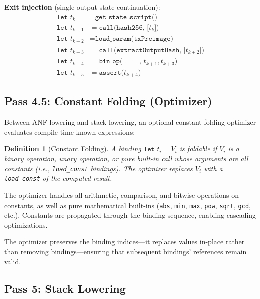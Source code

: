\documentclass[11pt,a4paper]{article}
\newtheorem{definition}[theorem]{Definition}
\begin{document}
\textbf{Exit injection} (single-output state continuation):
\begin{align*}
  \texttt{let } t_k &= \texttt{get\_state\_script()} \\
  \texttt{let } t_{k+1} &= \texttt{call(hash256, [}t_k\texttt{])} \\
  \texttt{let } t_{k+2} &= \texttt{load\_param(txPreimage)} \\
  \texttt{let } t_{k+3} &= \texttt{call(extractOutputHash, [}t_{k+2}\texttt{])} \\
  \texttt{let } t_{k+4} &= \texttt{bin\_op(===, }t_{k+1}, t_{k+3}\texttt{)}  \\
  \texttt{let } t_{k+5} &= \texttt{assert(}t_{k+4}\texttt{)}
\end{align*}

\subsection{Pass 4.5: Constant Folding (Optimizer)}
\label{sec:pass-optimize}

Between ANF lowering and stack lowering, an optional constant folding
optimizer evaluates compile-time-known expressions:

\begin{definition}[Constant Folding]
A binding $\texttt{let } t_i = V_i$ is \emph{foldable} if $V_i$ is a
binary operation, unary operation, or pure built-in call whose arguments
are all constants (i.e., \texttt{load\_const} bindings). The optimizer
replaces $V_i$ with a \texttt{load\_const} of the computed result.
\end{definition}

The optimizer handles all arithmetic, comparison, and bitwise operations on
constants, as well as pure mathematical built-ins (\texttt{abs}, \texttt{min},
\texttt{max}, \texttt{pow}, \texttt{sqrt}, \texttt{gcd}, etc.). Constants
are propagated through the binding sequence, enabling cascading optimizations.

The optimizer preserves the binding indices---it replaces values in-place
rather than removing bindings---ensuring that subsequent bindings' references
remain valid.

\subsection{Pass 5: Stack Lowering}
\label{sec:pass-stack}
\end{document}
